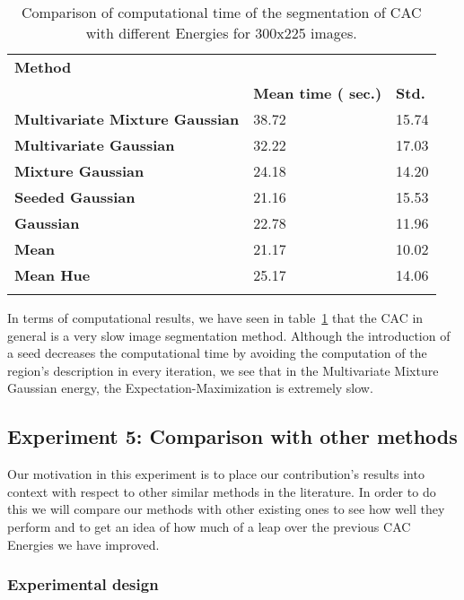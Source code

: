 \begin{table}[h!]
	\centering
	
	\begin{tabular}{lll}
		\toprule
		\textbf{Method}& & \\
		& \textbf{Mean time ( sec.)} & \textbf{Std.}   \\ \midrule
		\textbf{Multivariate Mixture Gaussian} & 38.72 & 15.74 \\
		\textbf{Multivariate Gaussian} & 32.22 & 17.03\\ 
		\textbf{Mixture Gaussian} & 24.18 & 14.20 \\ 
		\textbf{Seeded Gaussian} & 21.16 & 15.53  \\ 
		\textbf{Gaussian} & 22.78 & 11.96 \\
		\textbf{Mean} & 21.17 & 10.02 \\
		\textbf{Mean Hue} & 25.17 & 14.06\\
		\vspace{0.5em}
	\end{tabular}
	\caption{Comparison of computational time of the segmentation of CAC with different Energies for  300x225 images.}
	\label{table:computational_time}
\end{table}

In terms of computational results, we have seen in table~\ref{table:computational_time} that the CAC in general is a very slow image segmentation method. Although the introduction of a seed decreases the computational time by avoiding the computation of the region's description in every iteration, we see that in the Multivariate Mixture Gaussian energy, the Expectation-Maximization is extremely slow.

\subsection{Experiment 5: Comparison with other methods}

Our motivation in this experiment is to place our contribution's results into context with respect to other similar methods in the literature. In order to do this we will compare our methods with other existing ones to see how well they perform and to get an idea of how much of a leap over the previous CAC Energies we have improved.


\subsubsection{Experimental design}


